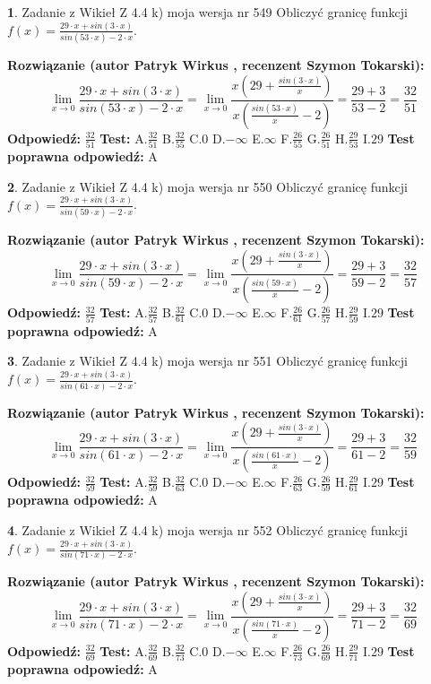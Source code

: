 \documentclass[12pt, a4paper]{article}
\theoremstyle{definition} %
\newtheorem{zad}{}
\newcommand{\zadStart}[1]{\begin{zad}#1\newline}
\newcommand{\zadStop}{\end{zad}}
\newcommand{\rozwStart}[2]{\noindent \textbf{Rozwiązanie (autor #1 , recenzent #2): }\newline}
\newcommand{\rozwStop}{\newline}
\newcommand{\odpStart}{\noindent \textbf{Odpowiedź:}\newline}
\newcommand{\odpStop}{\newline}
\newcommand{\testStart}{\noindent \textbf{Test:}\newline}
\newcommand{\testStop}{\newline}
\newcommand{\kluczStart}{\noindent \textbf{Test poprawna odpowiedź:}\newline}
\newcommand{\kluczStop}{\newline}
\begin{document}
\zadStart{Zadanie z Wikieł Z 4.4 k) moja wersja nr 549}
Obliczyć granicę funkcji $f(x)=\frac{29\cdot x +sin(3\cdot x)}{sin(53\cdot x) -2\cdot x}$.
\zadStop
\rozwStart{Patryk Wirkus}{Szymon Tokarski}
$$\lim\limits_{x\to 0}\frac{29\cdot x +sin(3\cdot x)}{sin(53\cdot x) -2\cdot x}
=\lim\limits_{x\to 0}\frac{x(29+\frac{sin(3\cdot x)}{x})}{x(\frac{sin(53\cdot x)}{x}-2)}
=\frac{29+3}{53-2} = \frac{32}{51}$$
\rozwStop
\odpStart
$\frac{32}{51}$
\odpStop
\testStart
A.$\frac{32}{51}$
B.$\frac{32}{55}$
C.$0$
D.$-\infty$
E.$\infty$
F.$\frac{26}{55}$
G.$\frac{26}{51}$
H.$\frac{29}{53}$
I.$29$
\testStop
\kluczStart
A
\kluczStop



\zadStart{Zadanie z Wikieł Z 4.4 k) moja wersja nr 550}
Obliczyć granicę funkcji $f(x)=\frac{29\cdot x +sin(3\cdot x)}{sin(59\cdot x) -2\cdot x}$.
\zadStop
\rozwStart{Patryk Wirkus}{Szymon Tokarski}
$$\lim\limits_{x\to 0}\frac{29\cdot x +sin(3\cdot x)}{sin(59\cdot x) -2\cdot x}
=\lim\limits_{x\to 0}\frac{x(29+\frac{sin(3\cdot x)}{x})}{x(\frac{sin(59\cdot x)}{x}-2)}
=\frac{29+3}{59-2} = \frac{32}{57}$$
\rozwStop
\odpStart
$\frac{32}{57}$
\odpStop
\testStart
A.$\frac{32}{57}$
B.$\frac{32}{61}$
C.$0$
D.$-\infty$
E.$\infty$
F.$\frac{26}{61}$
G.$\frac{26}{57}$
H.$\frac{29}{59}$
I.$29$
\testStop
\kluczStart
A
\kluczStop



\zadStart{Zadanie z Wikieł Z 4.4 k) moja wersja nr 551}
Obliczyć granicę funkcji $f(x)=\frac{29\cdot x +sin(3\cdot x)}{sin(61\cdot x) -2\cdot x}$.
\zadStop
\rozwStart{Patryk Wirkus}{Szymon Tokarski}
$$\lim\limits_{x\to 0}\frac{29\cdot x +sin(3\cdot x)}{sin(61\cdot x) -2\cdot x}
=\lim\limits_{x\to 0}\frac{x(29+\frac{sin(3\cdot x)}{x})}{x(\frac{sin(61\cdot x)}{x}-2)}
=\frac{29+3}{61-2} = \frac{32}{59}$$
\rozwStop
\odpStart
$\frac{32}{59}$
\odpStop
\testStart
A.$\frac{32}{59}$
B.$\frac{32}{63}$
C.$0$
D.$-\infty$
E.$\infty$
F.$\frac{26}{63}$
G.$\frac{26}{59}$
H.$\frac{29}{61}$
I.$29$
\testStop
\kluczStart
A
\kluczStop



\zadStart{Zadanie z Wikieł Z 4.4 k) moja wersja nr 552}
Obliczyć granicę funkcji $f(x)=\frac{29\cdot x +sin(3\cdot x)}{sin(71\cdot x) -2\cdot x}$.
\zadStop
\rozwStart{Patryk Wirkus}{Szymon Tokarski}
$$\lim\limits_{x\to 0}\frac{29\cdot x +sin(3\cdot x)}{sin(71\cdot x) -2\cdot x}
=\lim\limits_{x\to 0}\frac{x(29+\frac{sin(3\cdot x)}{x})}{x(\frac{sin(71\cdot x)}{x}-2)}
=\frac{29+3}{71-2} = \frac{32}{69}$$
\rozwStop
\odpStart
$\frac{32}{69}$
\odpStop
\testStart
A.$\frac{32}{69}$
B.$\frac{32}{73}$
C.$0$
D.$-\infty$
E.$\infty$
F.$\frac{26}{73}$
G.$\frac{26}{69}$
H.$\frac{29}{71}$
I.$29$
\testStop
\kluczStart
A
\kluczStop
\end{document}
